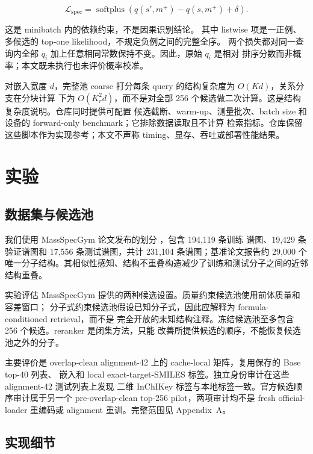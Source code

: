 \documentclass[UTF8,11pt]{ctexart}
\begin{document}
\begin{equation}
  \mathcal{L}_{\mathrm{spec}}
  =\operatorname{softplus}\!\left(
  q(s',m^+)-q(s,m^+)+\delta\right).
  \label{eq:spectrum_dependency_cn}
\end{equation}

这是 minibatch 内的依赖约束，不是因果识别结论。
其中 listwise 项是一正例、多候选的 top-one likelihood，不规定负例之间的完整全序。
两个损失都对同一查询内全部 $q_i$ 加上任意相同常数保持不变。因此，原始 $q_i$ 是相对
排序分数而非概率；本文既未执行也未评价概率校准。

对嵌入宽度 $d$，完整池 coarse 打分每条 query 的结构复杂度为 $O(Kd)$，关系分支在分块计算
下为 $O(K_r^2d)$，而不是对全部 256 个候选做二次计算。这是结构复杂度说明。仓库同时提供可配置
候选截断、warm-up、测量批次、batch size 和设备的 forward-only benchmark；它排除数据读取且不计算
检索指标。仓库保留这些脚本作为实现参考；本文不声称 timing、显存、吞吐或部署性能结果。

\section{实验}

\subsection{数据集与候选池}

我们使用 MassSpecGym 论文发布的划分 \cite{bushuiev2024massspecgym}，包含 194,119 条训练
谱图、19,429 条验证谱图和 17,556 条测试谱图，共计 231,104 条谱图；基准论文报告约
29,000 个唯一分子结构。其相似性感知、结构不重叠构造减少了训练和测试分子之间的近邻
结构重叠。

实验评估 MassSpecGym 提供的两种候选设置。质量约束候选池使用前体质量和容差窗口；
分子式约束候选池假设已知分子式，因此应解释为 formula-conditioned retrieval，而不是
完全开放的未知结构注释。冻结候选池至多包含 256 个候选。reranker 是闭集方法，只能
改善所提供候选的顺序，不能恢复候选池之外的分子。

主要评价是 overlap-clean alignment-42 上的 cache-local 矩阵，复用保存的 Base top-40 列表、
嵌入和 local exact-target-SMILES 标签。独立身份审计在这些 alignment-42 测试列表上发现
二维 InChIKey 标签与本地标签一致。官方候选顺序审计属于另一个 pre-overlap-clean top-256
pilot，两项审计均不是 fresh official-loader 重编码或 alignment 重训。完整范围见 Appendix~A。

\subsection{实现细节}
\end{document}
